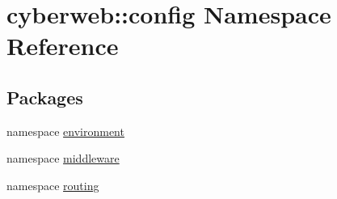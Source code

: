 \hypertarget{namespacecyberweb_1_1config}{\section{cyberweb\-:\-:config \-Namespace \-Reference}
\label{namespacecyberweb_1_1config}
}
\subsection*{\-Packages}
\begin{DoxyCompactItemize}
\item 
namespace \hyperlink{namespacecyberweb_1_1config_1_1environment}{environment}
\item 
namespace \hyperlink{namespacecyberweb_1_1config_1_1middleware}{middleware}
\item 
namespace \hyperlink{namespacecyberweb_1_1config_1_1routing}{routing}
\end{DoxyCompactItemize}

